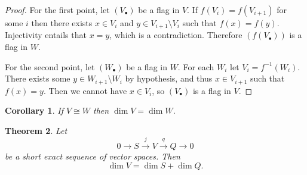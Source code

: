\documentclass[11pt]{article}
\newtheorem{theo}{Theorem}[section]
\newtheorem{coro}[theo]{Corollary}
\theoremstyle{definition}
\begin{document}
\begin{proof}
For the first point, let $(V_\bullet)$ be a flag in $V$.
If $f(V_i) = f(V_{i+1})$ for some $i$ then there exists $x \in V_i$ and $y \in V_{i+1} \setminus V_i$ such that $f(x) = f(y)$.
Injectivity entails that $x = y$, which is a contradiction.
Therefore $(f(V_\bullet))$ is a flag in $W$.

For the second point, let $(W_\bullet)$ be a flag in $W$.
For each $W_i$ let $V_i = f^{-1}(W_i)$.
There exists some $y \in W_{i+1} \setminus W_i$ by hypothesis, and thus $x \in V_{i+1}$ such that $f(x) = y$.
Then we cannot have $x \in V_i$, so $(V_\bullet)$ is a flag in $V$.
\end{proof}

\begin{coro}
If $V \cong W$ then $\dim V = \dim W$.
\end{coro}


\begin{theo}
Let
\[
0 \longrightarrow 
S \stackrel{j}{\longrightarrow} 
V \stackrel{q}{\longrightarrow} 
Q \longrightarrow 0
\]
be a short exact sequence of vector spaces.
Then
\[
\dim V = \dim S + \dim Q.
\]
\end{theo}
\end{document}
